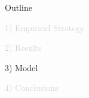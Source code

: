 \documentclass[aspectratio=169]{beamer}
\begin{document}


\begin{frame}[noframenumbering]{Outline}

\Large

\textcolor{lightgray}{1) Empirical Strategy}

\vspace{5mm}

\textcolor{lightgray}{2) Results}

\vspace{5mm}

3) Model

\vspace{5mm}

\textcolor{lightgray}{4) Conclusions}

\end{frame}

\end{document}
